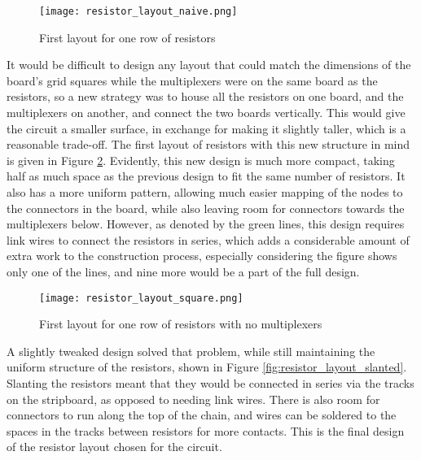 \begin{figure}[H]
	\begin{center}
	\texttt{[image: resistor\_layout\_naive.png]}\\ 
  	\caption{First layout for one row of resistors}
    \label{fig:resistor_layout_naive}
    \end{center}
\end{figure}


It would be difficult to design any layout that could match the dimensions of the board's grid squares while the multiplexers were on the same board as the resistors, so a new strategy was to house all the resistors on one board, and the multiplexers on another, and connect the two boards vertically. This would give the circuit a smaller surface, in exchange for making it slightly taller, which is a reasonable trade-off. The first layout of resistors with this new structure in mind is given in Figure \ref{fig:resistor_layout_square}. Evidently, this new design is much more compact, taking half as much space as the previous design to fit the same number of resistors. It also has a more uniform pattern, allowing much easier mapping of the nodes to the connectors in the board, while also leaving room for connectors towards the multiplexers below. However, as denoted by the green lines, this design requires link wires to connect the resistors in series, which adds a considerable amount of extra work to the construction process, especially considering the figure shows only one of the lines, and nine more would be a part of the full design. \\

\begin{figure}[H]
	\begin{center}
	\texttt{[image: resistor\_layout\_square.png]}\\ 
  	\caption{First layout for one row of resistors with no multiplexers}
    \label{fig:resistor_layout_square}
    \end{center}
\end{figure}


A slightly tweaked design solved that problem, while still maintaining the uniform structure of the resistors, shown in Figure \ref{fig:resistor_layout_slanted}. Slanting the resistors meant that they would be connected in series via the tracks on the stripboard, as opposed to needing link wires. There is also room for connectors to run along the top of the chain, and wires can be soldered to the spaces in the tracks between resistors for more contacts. This is the final design of the resistor layout chosen for the circuit.

